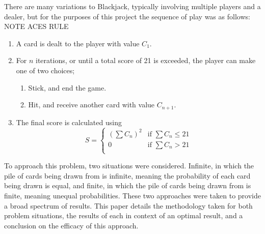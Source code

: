\smallskip
There are many variations to Blackjack, typically involving multiple players and a dealer, but for the purposes of this project the sequence of play was as follows: NOTE ACES RULE

\begin{enumerate}
    \item A card is dealt to the player with value \(C_1\).
    \item For \(n\) iterations, or until a total score of 21 is exceeded, the player can make one of two choices;
    \begin{enumerate} 
        \item Stick, and end the game.
        \item Hit, and receive another card with value \(C_{n+1}\).
    \end{enumerate}
    \item The final score is calculated using
        \begin{equation}
            S = 
            \begin{cases}
                (\sum C_n)^2 & \text{if } \sum C_n \le 21\\
                0            & \text{if } \sum C_n >   21\\
            \end{cases}
        \end{equation}
\end{enumerate}

To approach this problem, two situations were considered. Infinite, in which the pile of cards being drawn from is infinite, meaning the probability of each card being drawn is equal, and finite, in which the pile of cards being drawn from is finite, meaning unequal probabilities. These two approaches were taken to provide a broad spectrum of results. This paper details the methodology taken for both problem situations, the results of each in context of an optimal result, and a conclusion on the efficacy of this approach.


